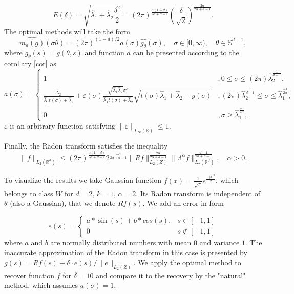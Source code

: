 \documentclass[12pt]{iopart}
\begin{document}
	$$
	E(\delta)=\sqrt{\widehat\lambda_1+\widehat\lambda_2\frac{\delta^2}{2}}=(2\pi)^{\frac{\alpha(1-d)}{2\alpha+d-1}}\left(\frac{\delta}{\sqrt{2}}\right)^{\frac{2\alpha}{2\alpha+d-1}}.
	$$
	The optimal methods will take the form 
	$$
	\widehat{m_a(g)}(\sigma\theta)=(2\pi)^{(1-d)/2}a(\sigma)\widehat{g_\theta }(\sigma),\quad \sigma\in[0,\infty),\quad \theta\in\mathbb S^{d-1},
	$$
	where $g_{\theta}(s)=g(\theta,s)$ and function $a$ can be presented according to the corollary \ref{cor} as
	$$
	a(\sigma)=
	\begin{cases}
	1& ,0\leqslant\sigma\leqslant (2\pi)\widehat\lambda_2^\frac{1}{d-1},\\
	\frac{\widehat\lambda_2}{\widehat\lambda_1t(\sigma)+\widehat\lambda_2}+\varepsilon(\sigma)\frac{\sqrt{\widehat\lambda_1\widehat\lambda_2}\sigma^\alpha}{\widehat\lambda_1t(\sigma)+\widehat\lambda_2}\sqrt{t(\sigma)\widehat\lambda_1+\widehat\lambda_2-y(\sigma)}& ,(2\pi)\widehat\lambda_2^\frac{1}{d-1} \leqslant\sigma\leqslant\widehat\lambda_1^{\frac{-1}{2\alpha}},\\
	0 &,\sigma\geqslant\widehat\lambda_1^{\frac{-1}{2\alpha}},
	\end{cases}
	$$
	$\varepsilon$ is an arbitrary function satisfying $\|\varepsilon\|_{L_\infty(\mathbb R)}\leqslant 1$.
	
	Finally, the Radon transform satisfies the inequality
	$$
	\|f\|_{L_2(\mathbb R^d)}\leqslant
	(2\pi)^{\frac{\alpha(1-d)}{2\alpha+d-1}}2^{\frac{-\alpha}{2\alpha+d-1}}\|Rf\|_{L_2(Z)}^{\frac{2\alpha}{2\alpha+d-1}}\|\Lambda^\alpha f\|_{L_2(\mathbb
		R^d)}^\frac{d-1}{2\alpha+d-1},\quad \alpha>0.
	$$
	
	To visualize the results we take Gaussian function $f(x)=\frac{1}{\sqrt{\pi}}e^\frac{-|x|^2}{2}$, which belongs to class $W$ for $d=2$, $k=1$, $\alpha = 2$. Its Radon transform is independent of $\theta$ (also a Gaussian), that we denote $Rf(s)$. We add an error in form 
	
	$$e(s) = \begin{cases}
a*\sin(s)+b*cos(s), & s\in[-1,1] \\
0 & s\notin[-1,1]
\end{cases}
$$
where $a$ and $b$ are normally distributed numbers with mean $0$ and variance $1$. The inaccurate approximation of the Radon transform in this case is presented by $g(s)=Rf(s)+\delta \cdot e(s)/\|e\|_{L_2(Z)}$. We apply the optimal method to recover function $f$ for $\delta=10$ and compare it to the recovery by the "natural" method, which assumes $a(\sigma)=1$.
\end{document}
